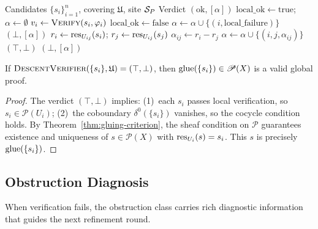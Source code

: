 \documentclass[11pt]{article}
\newcommand{\DescentVerifier}{\textsc{DescentVerifier}}
\newcommand{\ProofSheaf}{\mathscr{P}}
\begin{document}
\begin{algorithm}[H]
\caption{$\textsc{DescentVerify}$: Formal Verification of Candidate Sections}
\label{alg:descent-verify}
\begin{algorithmic}[1]
\REQUIRE Candidates $\{s_i\}_{i=1}^n$, covering $\mathfrak{U}$,
  site $\mathcal{S}_P$
\ENSURE Verdict $(\text{ok}, [\alpha])$
\STATE $\text{local\_ok} \leftarrow \mathrm{true}$; $\alpha \leftarrow \emptyset$
  \STATE $v_i \leftarrow \textsc{Verify}(s_i, \varphi_i)$
    \STATE $\text{local\_ok} \leftarrow \mathrm{false}$
    \STATE $\alpha \leftarrow \alpha \cup \{(i, \text{local\_failure})\}$
  \ENDIF
\ENDFOR
{}
  \RETURN $(\bot, [\alpha])$
\ENDIF
{}
  \STATE $r_i \leftarrow \mathrm{res}_{U_{ij}}(s_i)$;
    $r_j \leftarrow \mathrm{res}_{U_{ij}}(s_j)$
    \STATE $\alpha_{ij} \leftarrow r_i - r_j$
    \STATE $\alpha \leftarrow \alpha \cup \{(i, j, \alpha_{ij})\}$
  \ENDIF
\ENDFOR
\IF{$\alpha = \emptyset$}
  \RETURN $(\top, \bot)$
\ELSE
  \RETURN $(\bot, [\alpha])$
\ENDIF
\end{algorithmic}
\end{algorithm}

\begin{theorem}\label{thm:soundness}
If $\DescentVerifier(\{s_i\}, \mathfrak{U}) = (\top, \bot)$, then
$\glue(\{s_i\}) \in \ProofSheaf(X)$ is a valid global proof.
\end{theorem}

\begin{proof}
The verdict $(\top, \bot)$ implies: (1)~each $s_i$ passes local
verification, so $s_i \in \ProofSheaf(U_i)$; (2)~the coboundary
$\delta^0(\{s_i\})$ vanishes, so the cocycle condition holds.  By
Theorem~\ref{thm:gluing-criterion}, the sheaf condition on
$\ProofSheaf$ guarantees existence and uniqueness of
$s \in \ProofSheaf(X)$ with $\mathrm{res}_{U_i}(s) = s_i$.  This $s$ is
precisely $\mathrm{glue}(\{s_i\})$.
\end{proof}

\subsection{Obstruction Diagnosis}\label{subsec:obstruction}

When verification fails, the obstruction class carries rich diagnostic
information that guides the next refinement round.
\end{document}
